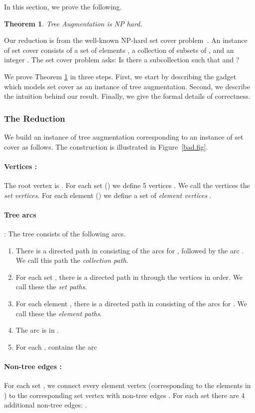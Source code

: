 \documentclass{article}
\newtheorem{theorem}{Theorem}
\begin{document}
In this section, we prove the following.
\begin{theorem}
\label{thm:hard}
{\sc Tree Augmentation} is NP hard.
\end{theorem}
Our reduction is from the well-known NP-hard {\sc set cover} problem~\cite{GJ79}. 
An instance of {\sc set cover} consists of a set of elements , a
collection of subsets of ,  and an
integer .  The {\sc set cover} problem asks: Is there a
subcollection  such that  and ?

We prove Theorem \ref{thm:hard} in three steps. 
First, we start by describing the gadget which models {\sc set cover} as an instance of {\sc tree augmentation}.
Second, we describe the intuition behind our result. 
Finally, we give the formal details of correctness.


\subsubsection*{The Reduction}  
We build an instance  of {\sc tree augmentation}
corresponding to an instance of {\sc set cover} as follows.  The construction is
illustrated in Figure~\ref{bad.fig}.

\paragraph{Vertices :} The root vertex is .  For each set  () we define 5 vertices .
  We call the vertices  the {\em set vertices}.
  For each element  () we
  define a set of  {\em element vertices} .
\paragraph{Tree arcs} : 
The tree  consists of the following arcs.
  \begin{enumerate}
	  \item There is a directed path in  consisting of the arcs 
		  for , followed by the arc .
		  We call this path the {\em collection path}.
	  \item For each set , there is a directed path in  through the vertices
     in order.  We call these the {\em set paths}.
  \item For each element , there is a directed path in  consisting of
	  the arcs  for .
    We call these the {\em element paths}.
  \item The arc  is in .
  \item For each ,  contains the arc 
  \end{enumerate}
\paragraph{Non-tree edges :}  For each set , we connect every
  element vertex (corresponding to the elements in ) to the
  corresponding set vertex with non-tree edges .  For each set  there are 4
  additional non-tree edges: .
\end{document}
